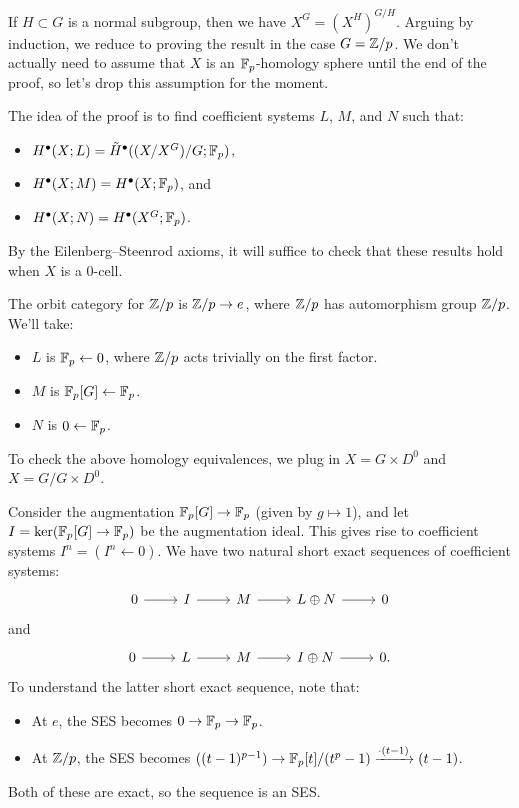 \documentclass{article}
\begin{document}
If $H \subset G$ is a normal subgroup, then we have $X^G = (X^H)^{G/H}$.
Arguing by induction, we reduce to proving the result in the case $G = \mathbb{Z} / p$.
We don't actually need to assume that $X$ is an $\mathbb{F}_p$-homology sphere until the end of the proof, so let's drop this assumption for the moment.

The idea of the proof is to find coefficient systems $L$, $M$, and $N$ such that:
\begin{itemize}
  \item $H^\bullet(X; L) = \tilde{H}^\bullet((X / X^G) /  G; \mathbb{F}_p)$,
  \item $H^\bullet(X; M) = H^\bullet(X; \mathbb{F}_p)$, and
  \item $H^\bullet(X; N) = H^\bullet(X^G; \mathbb{F}_p)$.
\end{itemize}
By the Eilenberg--Steenrod axioms, it will suffice to check that these results hold when $X$ is a $0$-cell.

The orbit category for $\mathbb{Z}/p$ is $\mathbb{Z}/p \to e$, where $\mathbb{Z}/p$ has automorphism group $\mathbb{Z}/p$.
We'll take:
\begin{itemize}
  \item $L$ is $\mathbb{F}_p \leftarrow 0$, where $\mathbb{Z}/p$ acts trivially on the first factor.
  \item $M$ is $\mathbb{F}_p[G] \leftarrow \mathbb{F}_p$.
  \item $N$ is $0 \leftarrow \mathbb{F}_p$.
\end{itemize}
To check the above homology equivalences, we plug in $X = G \times D^0$ and $X = G / G \times D^0$.

Consider the augmentation $\mathbb{F}_p[G] \to \mathbb{F}_p$ (given by $g \mapsto 1$), and let $I = \ker(\mathbb{F}_p[G] \to \mathbb{F}_p)$ be the augmentation ideal.
This gives rise to coefficient systems $I^n = (I^n \leftarrow 0)$.
We have two natural short exact sequences of coefficient systems:
\[
  \begin{tikzcd}
    0 \rar & I \rar & M \rar & L \oplus N \rar & 0
  \end{tikzcd}
\]
and
\[
  \begin{tikzcd}
    0 \rar & L \rar & M \rar & I \oplus N \rar & 0.
  \end{tikzcd}
\]
To understand the latter short exact sequence, note that:
\begin{itemize}
  \item At $e$, the SES becomes $0 \to \mathbb{F}_p \to \mathbb{F}_p$.
  \item At $\mathbb{Z}/p$, the SES becomes $((t-1)^{p-1}) \to \mathbb{F}_p[t] / (t^p - 1) \xrightarrow{\cdot (t-1)} (t - 1)$.
\end{itemize}
Both of these are exact, so the sequence is an SES.
\end{document}

